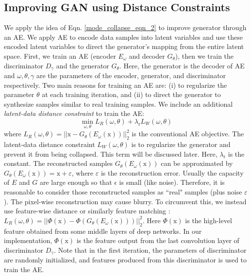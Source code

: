 \documentclass[runningheads]{llncs}
\begin{document}
\subsection{Improving GAN using Distance Constraints}
We apply the idea of Eqn. \ref{mode_collapse_eqn_2} to improve generator through an AE. We apply AE to encode data samples into latent variables and use these encoded latent variables to direct the generator's mapping from the entire latent space. First, we train an  AE (encoder $E_{\omega}$ and decoder $G_\theta$), then we   train the discriminator $D_{\gamma}$ and the generator $G_{\theta}$. Here, the generator is the decoder of AE and $\omega, \theta, \gamma$ are the parameters of the encoder, generator, and discriminator respectively. Two main reasons for training an AE are: (i) to regularize the parameter $\theta$ at each training iteration, and (ii) to direct the generator to synthesize samples similar to real training samples. 
We include an additional {\em latent-data distance constraint} to train the AE:
\begin{equation}
\min_{\omega,\theta} L_R(\omega,\theta) + \lambda_{\mathrm{r}} L_W(\omega,\theta)
\label{recon_01}
\end{equation}
where $L_R(\omega,\theta) = ||\mathrm{x} - G_{\theta}(E_{\omega}(\mathrm{x}))||_2^2$ is the conventional AE objective.
The latent-data distance constraint $L_W(\omega,\theta)$ is to regularize the generator and prevent it from being collapsed. This term will be discussed later. Here, $\lambda_{\mathrm{r}}$ is the constant. The reconstructed samples $G_{\theta}(E_{\omega}(\mathrm{x}))$ can be approximated by $G_{\theta}(E_{\omega}(\mathrm{x})) = \mathrm{x} + \varepsilon$, where $\varepsilon$ is the reconstruction error. Usually the capacity of $E$ and $G$ are large enough so that $\epsilon$ is small (like noise). Therefore, it is reasonable to consider those reconstructed samples as ``real" samples (plus noise $\varepsilon$). The pixel-wise reconstruction may cause blurry. To circumvent this, we instead use feature-wise distance \cite{larsen-arxiv-2015} or similarly feature matching \cite{salimans-nisp-2016}:  $L_R(\omega,\theta) = ||\Phi(\mathrm{x}) - \Phi(G_{\theta}(E_{\omega}(\mathrm{x})))||_2^2$. Here
$\Phi(\mathrm{x})$ is the high-level feature obtained from some middle layers of deep networks. In our implementation, $\Phi(\mathrm{x})$ is the feature output from the last convolution layer of discriminator $D_{\gamma}$. Note that in the first iteration, the parameters of discriminator are randomly initialized, and features produced from this discriminator is used to train the AE. 
\end{document}
